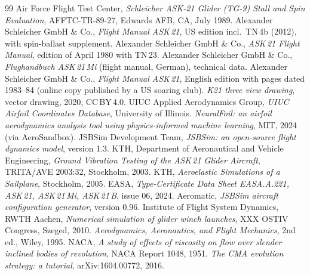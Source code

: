 \documentclass[10pt,a4paper,twocolumn]{article}
\begin{document}
\begin{thebibliography}{99}\small
{} Air Force Flight Test Center, \emph{Schleicher ASK-21 Glider (TG-9) Stall and Spin Evaluation}, AFFTC-TR-89-27, Edwards AFB, CA, July 1989.
 Alexander Schleicher GmbH \& Co., \emph{Flight Manual ASK\,21}, US edition incl.\ TN\,4b (2012), with spin-ballast supplement.
 Alexander Schleicher GmbH \& Co., \emph{ASK\,21 Flight Manual}, edition of April 1980 with TN\,23.
 Alexander Schleicher GmbH \& Co., \emph{Flughandbuch ASK\,21\,Mi} (flight manual, German), technical data.
 Alexander Schleicher GmbH \& Co., \emph{Flight Manual ASK\,21}, English edition with pages dated 1983--84 (online copy published by a US soaring club).
 \emph{K21 three view drawing}, vector drawing, 2020, CC\,BY\,4.0.
 UIUC Applied Aerodynamics Group, \emph{UIUC Airfoil Coordinates Database}, University of Illinois.
 \emph{NeuralFoil: an airfoil aerodynamics analysis tool using physics-informed machine learning}, MIT, 2024 (via AeroSandbox).
 JSBSim Development Team, \emph{JSBSim: an open-source flight dynamics model}, version 1.3.
 KTH, Department of Aeronautical and Vehicle Engineering, \emph{Ground Vibration Testing of the ASK\,21 Glider Aircraft}, TRITA/AVE 2003:32, Stockholm, 2003.
 KTH, \emph{Aeroelastic Simulations of a Sailplane}, Stockholm, 2005.
 EASA, \emph{Type-Certificate Data Sheet EASA.A.221, ASK\,21, ASK\,21\,Mi, ASK\,21\,B}, issue 06, 2024.
 Aeromatic, \emph{JSBSim aircraft configuration generator}, version 0.96.
 Institute of Flight System Dynamics, RWTH Aachen, \emph{Numerical simulation of glider winch launches}, XXX OSTIV Congress, Szeged, 2010.
 \emph{Aerodynamics, Aeronautics, and Flight Mechanics}, 2nd ed., Wiley, 1995.
 NACA, \emph{A study of effects of viscosity on flow over slender inclined bodies of revolution}, NACA Report 1048, 1951.
 \emph{The CMA evolution strategy: a tutorial}, arXiv:1604.00772, 2016.
\end{thebibliography}
\end{document}
